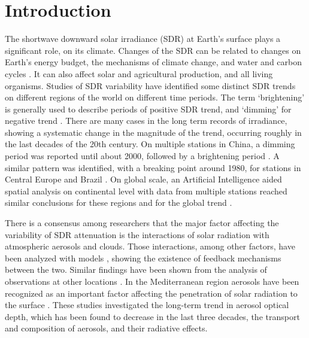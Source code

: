 \documentclass[applsci,article,submit,moreauthors,pdftex]{Definitions/mdpi}
\begin{document}

\hypertarget{introduction}{%
\section{Introduction}\label{introduction}}

The shortwave downward solar irradiance (SDR) at Earth's surface plays a
significant role, on its climate. Changes of the SDR can be related to
changes on Earth's energy budget, the mechanisms of climate change, and
water and carbon cycles \citep{Wild2009}. It can also affect solar and
agricultural production, and all living organisms. Studies of SDR
variability have identified some distinct SDR trends on different
regions of the world on different time periods. The term `brightening'
is generally used to describe periods of positive SDR trend, and
`dimming' for negative trend \citep{Wild2009}. There are many cases in
the long term records of irradiance, showing a systematic change in the
magnitude of the trend, occurring roughly in the last decades of the
20th century. On multiple stations in China, a dimming period was
reported until about 2000, followed by a brightening period
\citep{Yang2021}. A similar pattern was identified, with a breaking
point around 1980, for stations in Central Europe \citep{Wild2021} and
Brazil \citep{Yamasoe2021}. On global scale, an Artificial Intelligence
aided spatial analysis on continental level with data from multiple
stations reached similar conclusions for these regions and for the
global trend \citep{Yuan2021}.

There is a consensus among researchers that the major factor affecting
the variability of SDR attenuation is the interactions of solar
radiation with atmospheric aerosols and clouds. Those interactions,
among other factors, have been analyzed with models
\citep{Li2016, Samset2018}, showing the existence of feedback mechanisms
between the two. Similar findings have been shown from the analysis of
observations at other locations \citep[ and references
therein]{Schwarz2020, Ohvril2009, Zerefos2009, Xia2007}. In the
Mediterranean region aerosols have been recognized as an important
factor affecting the penetration of solar radiation to the surface
\citep{Fountoulakis2016, Siomos2018, Gkikas2013, Lozano2021}. These
studies investigated the long-term trend in aerosol optical depth, which
has been found to decrease in the last three decades, the transport and
composition of aerosols, and their radiative effects.
\end{document}
